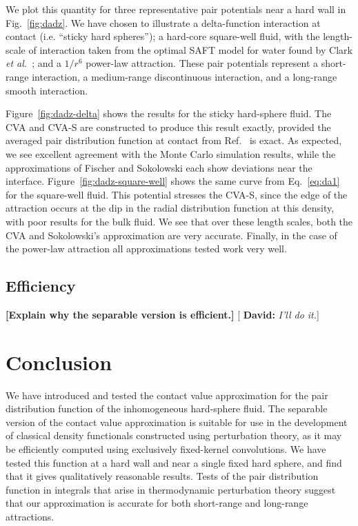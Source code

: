 \documentclass[letterpaper,twocolumn,amsmath,amssymb,pre,aps,10pt]{revtex4-1}
\newcommand{\red}[1]{{\bf \color{red} #1}}
\newcommand{\green}[1]{{\bf \color{green} #1}}
\newcommand{\fixme}[1]{\red{[#1]}}
\newcommand{\davidsays}[1]{{\color{red} [\green{David:} \emph{#1}]}}
\begin{document}
We plot this quantity for three representative
pair potentials near a hard wall in Fig.~\ref{fig:dadz}.  We have
chosen to illustrate a delta-function interaction at contact
(i.e. ``sticky hard spheres''); a hard-core square-well fluid, with
the length-scale of interaction taken from the optimal SAFT model for
water found by Clark \emph{et al.}~\cite{clark2006developing}; and a
$1/r^6$ power-law attraction.  These pair potentials represent a
short-range interaction, a medium-range discontinuous interaction, and
a long-range smooth interaction.

Figure~\ref{fig:dadz-delta} shows the results for the sticky
hard-sphere fluid.  The CVA and CVA-S are constructed to produce this
result exactly, provided the averaged pair distribution function at
contact from Ref.~ is exact.  As expected,
we see excellent agreement with the Monte Carlo simulation results,
while the approximations of Fischer and Sokolowski each show
deviations near the interface.  Figure~\ref{fig:dadz-square-well}
shows the same curve from Eq.~\ref{eq:da1} for the square-well fluid.
This potential stresses the CVA-S, since the edge of the attraction
occurs at the dip in the radial distribution function at this density,
with poor results for the bulk fluid.  We see that over these length
scales, both the CVA and Sokolowski's approximation are very accurate.
Finally, in the case of the power-law attraction all approximations
tested work very well.

\subsection{Efficiency}

\fixme{Explain why the separable version is efficient.}\davidsays{I'll
  do it.}

\section{Conclusion}

We have introduced and tested the contact value approximation for the pair
distribution function of the inhomogeneous hard-sphere fluid.  The
separable version of the contact value
approximation is suitable for use in the development of classical
density functionals constructed using perturbation theory, as it
may be efficiently computed using exclusively fixed-kernel convolutions.  We have
tested this function at a hard wall and near a single fixed hard
sphere, and find that it gives qualitatively reasonable results.
Tests of the pair distribution function in integrals that arise in
thermodynamic perturbation theory suggest that our approximation is
accurate for both short-range and long-range attractions.

\end{document}
